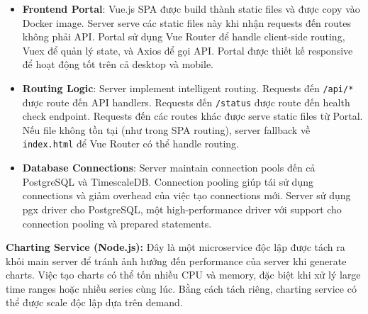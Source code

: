 \begin{itemize}
\begin{itemize}
            \item \textbf{Geographic queries với PostGIS}: API hỗ trợ spatial queries để tìm stations trong một khu vực địa lý cụ thể. Ví dụ, có thể query tất cả stations trong bán kính 10km từ một điểm. PostGIS cung cấp các functions như \texttt{ST\_Distance}, \texttt{ST\_Within}, \texttt{ST\_Buffer} để thực hiện các spatial operations.
        \end{itemize}
    
    \item \textbf{Frontend Portal}: Vue.js SPA được build thành static files và được copy vào Docker image. Server serve các static files này khi nhận requests đến routes không phải API. Portal sử dụng Vue Router để handle client-side routing, Vuex để quản lý state, và Axios để gọi API. Portal được thiết kế responsive để hoạt động tốt trên cả desktop và mobile.
    
    \item \textbf{Routing Logic}: Server implement intelligent routing. Requests đến \texttt{/api/*} được route đến API handlers. Requests đến \texttt{/status} được route đến health check endpoint. Requests đến các routes khác được serve static files từ Portal. Nếu file không tồn tại (như trong SPA routing), server fallback về \texttt{index.html} để Vue Router có thể handle routing.
    
    \item \textbf{Database Connections}: Server maintain connection pools đến cả PostgreSQL và TimescaleDB. Connection pooling giúp tái sử dụng connections và giảm overhead của việc tạo connections mới. Server sử dụng pgx driver cho PostgreSQL, một high-performance driver với support cho connection pooling và prepared statements.
\end{itemize}

\textbf{Charting Service (Node.js):} Đây là một microservice độc lập được tách ra khỏi main server để tránh ảnh hưởng đến performance của server khi generate charts. Việc tạo charts có thể tốn nhiều CPU và memory, đặc biệt khi xử lý large time ranges hoặc nhiều series cùng lúc. Bằng cách tách riêng, charting service có thể được scale độc lập dựa trên demand.

